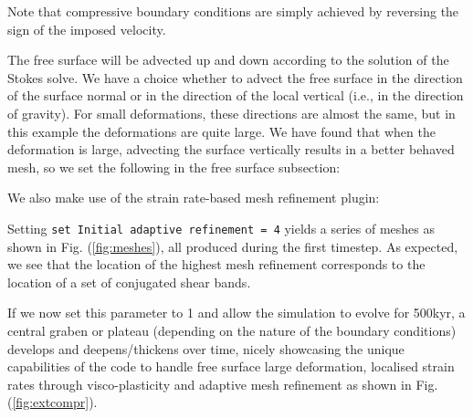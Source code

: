 

Note that compressive boundary conditions are simply achieved by reversing
the sign of the imposed velocity.

The free surface will be advected up and down according to the solution of the Stokes solve.
We have a choice whether to advect the free surface in the direction of the surface normal
or in the direction of the local vertical (i.e., in the direction of gravity).
For small deformations, these directions are almost the same, but in this example the deformations
are quite large. We have found that when the deformation is large, advecting the surface vertically
results in a better behaved mesh, so we set the following in the free surface subsection:



We also make use of the strain rate-based mesh refinement plugin:



Setting
{\tt   set Initial adaptive refinement        = 4}
yields a series of meshes as shown in Fig. (\ref{fig:meshes}), all produced during the
first timestep. As expected, we see that the location of the highest mesh refinement
corresponds to the location of a set of conjugated shear bands.

If we now set this parameter to 1 and allow the simulation to evolve
for 500kyr, a central graben or plateau (depending on the nature
of the boundary conditions) develops and deepens/thickens over time, nicely showcasing
the unique capabilities of the code to handle free surface large deformation, localised
strain rates through visco-plasticity and adaptive mesh refinement as
shown in Fig. (\ref{fig:extcompr}).

